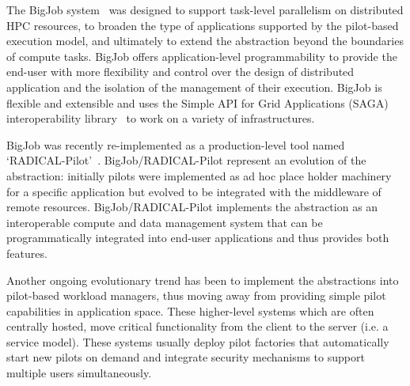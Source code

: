 \documentclass{sig-alternate}
\begin{document}
The BigJob \pilotjob system~\cite{luckow2010} was designed to support task-level
parallelism on distributed HPC resources, to broaden the type of applications
supported by the pilot-based execution model, and ultimately to extend the
\pilot abstraction beyond the boundaries of compute tasks. BigJob offers
application-level programmability to provide the end-user with more flexibility
and control over the design of distributed application and the isolation of the
management of their execution. BigJob is flexible and extensible and uses the
Simple API for Grid Applications (SAGA) interoperability
library~\cite{merzky2015saga,goodale2006,luckow2010} to work on a variety of
infrastructures.




BigJob was recently re-implemented as a production-level tool named
`RADICAL-Pilot'~\cite{merzky2015radical}. BigJob/RADICAL-Pilot represent an
evolution of the \pilot abstraction: initially pilots were implemented as ad hoc
place holder machinery for a specific application but evolved to be integrated
with the middleware of remote resources. BigJob/RADICAL-Pilot implements the
\pilot abstraction as an interoperable compute and data management system that
can be programmatically integrated into end-user applications and thus provides
both features.

Another ongoing evolutionary trend has been to implement the \pilot abstractions
into pilot-based workload managers, thus moving away from providing simple pilot
capabilities in application space. These higher-level systems which are often
centrally hosted, move critical functionality from the client to the server
(i.e. a service model). These systems usually deploy pilot factories that
automatically start new pilots on demand and integrate security mechanisms to
support multiple users simultaneously.

\end{document}
